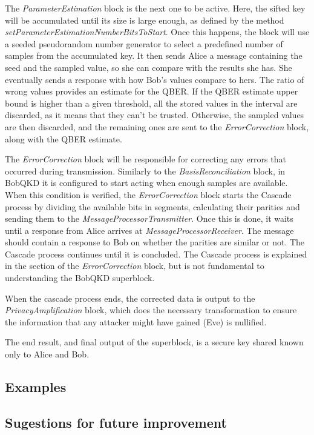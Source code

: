 The \textit{ParameterEstimation} block is the next one to be active. Here, the
sifted key will be accumulated until its size is large enough, as defined by the
method \textit{setParameterEstimationNumberBitsToStart}. Once this happens, the
block will use a seeded pseudorandom number generator to select a predefined number of
samples from the accumulated key. It then sends Alice a message containing the
seed and the sampled value, so she can compare with the results she has. She
eventually sends a response with how Bob's values compare to hers. The ratio of
wrong values provides an estimate for the QBER. If the QBER estimate upper bound is higher
than a given threshold, all the stored values in the interval are discarded, as
it means that they can't be trusted. Otherwise, the sampled values are then
discarded, and the remaining ones are sent to the \textit{ErrorCorrection}
block, along with the QBER estimate.

The \textit{ErrorCorrection} block will be responsible for correcting any 
errors that occurred during transmission. Similarly to the 
\textit{BasisReconciliation} block, in BobQKD it is configured to start acting 
when enough samples are available. When this condition is verified, the 
\textit{ErrorCorrection} block starts the Cascade process by dividing the 
available bits in segments, calculating their parities and sending them to the 
\textit{MessageProcessorTransmitter}. Once this is done, it waits until a 
response from Alice arrives at \textit{MessageProcessorReceiver}. The message 
should contain a response to Bob on whether the parities are similar or not. The 
Cascade process continues until it is concluded. The Cascade process is 
explained in the section of the \textit{ErrorCorrection} block, but is not 
fundamental to understanding the BobQKD superblock.

When the cascade process ends, the corrected data is output to the 
\textit{PrivacyAmplification} block, which does the necessary transformation to 
ensure the information that any attacker might have gained (Eve) is nullified.

The end result, and final output of the superblock, is a secure key 
shared known only to Alice and Bob.


\subsection*{Examples}


\subsection*{Sugestions for future improvement} 



